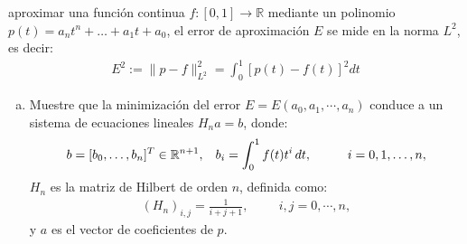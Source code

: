 \begin{homeworkProblem}
  aproximar una función continua $f:[0,1] \longrightarrow \mathbb{R}$ mediante un polinomio $p(t)=a_n t^n+\dots+a_1 t+a_0$,  el error de aproximación $E$ se mide en la norma $L^2$, es decir:
    \begin{align*}
        E^2:=\|p-f \|_{L^2}^2=\int_0^1[p(t)-f(t)]^2dt
    \end{align*}
  \begin{solucion}
    \begin{enumerate}[a)]
      \item Muestre que la minimización del error \( E = E(a_0, a_1, \cdots ,a_n) \) conduce a un sistema de ecuaciones lineales \( H_n a = b \), donde:
        \begin{align*}
            b = [b_0, \dots, b_n]^T \in \mathbb{R}^{n+1}, \hspace{0.3cm} b_i = \int_0^1 f(t)t^i \, dt, \hspace{1cm} i = 0, 1, \dots, n,
        \end{align*}
        \( H_n \) es la matriz de Hilbert de orden \( n \), definida como:
        \begin{align*}
            (H_n)_{i,j} = \frac{1}{i+j+1}, \hspace{1cm} i,j = 0, \cdots, n,
        \end{align*}
        y \( a \) es el vector de coeficientes de \( p \).\\
        

\end{enumerate}
\end{solucion}
\end{homeworkProblem}
